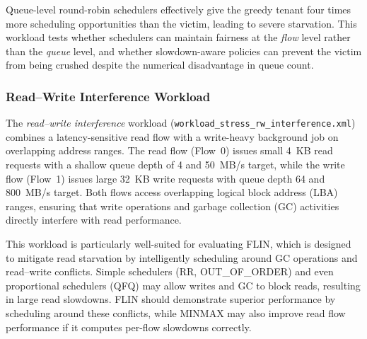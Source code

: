 Queue-level round-robin schedulers effectively give the greedy tenant four times more scheduling opportunities than the victim, leading to severe starvation. This workload tests whether schedulers can maintain fairness at the \emph{flow} level rather than the \emph{queue} level, and whether slowdown-aware policies can prevent the victim from being crushed despite the numerical disadvantage in queue count.

\subsubsection{Read--Write Interference Workload}

The \emph{read--write interference} workload (\texttt{workload\_stress\_rw\_interference.xml}) combines a latency-sensitive read flow with a write-heavy background job on overlapping address ranges. The read flow (Flow~0) issues small 4~KB read requests with a shallow queue depth of 4 and 50~MB/s target, while the write flow (Flow~1) issues large 32~KB write requests with queue depth 64 and 800~MB/s target. Both flows access overlapping logical block address (LBA) ranges, ensuring that write operations and garbage collection (GC) activities directly interfere with read performance.

This workload is particularly well-suited for evaluating FLIN, which is designed to mitigate read starvation by intelligently scheduling around GC operations and read--write conflicts. Simple schedulers (RR, OUT\_OF\_ORDER) and even proportional schedulers (QFQ) may allow writes and GC to block reads, resulting in large read slowdowns. FLIN should demonstrate superior performance by scheduling around these conflicts, while MINMAX may also improve read flow performance if it computes per-flow slowdowns correctly.

